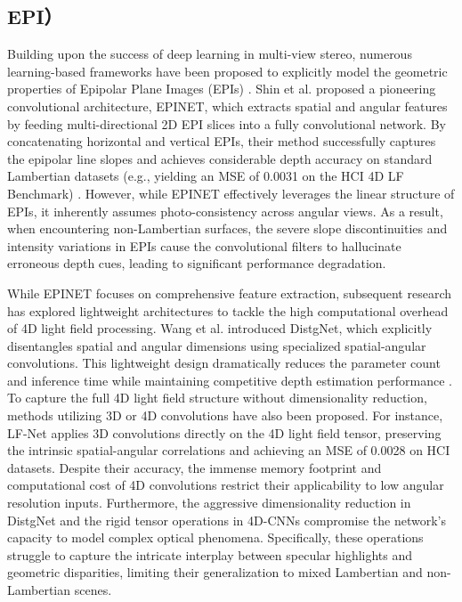 \documentclass[lettersize,journal]{IEEEtran}
\begin{document}
\subsection{EPI）}

Building upon the success of deep learning in multi-view stereo, numerous learning-based frameworks have been proposed to explicitly model the geometric properties of Epipolar Plane Images (EPIs) \cite{learninglearn}. Shin et al. \cite{shinshin} proposed a pioneering convolutional architecture, EPINET, which extracts spatial and angular features by feeding multi-directional 2D EPI slices into a fully convolutional network. By concatenating horizontal and vertical EPIs, their method successfully captures the epipolar line slopes and achieves considerable depth accuracy on standard Lambertian datasets (e.g., yielding an MSE of 0.0031 on the HCI 4D LF Benchmark) \cite{lambertian_24}. However, while EPINET effectively leverages the linear structure of EPIs, it inherently assumes photo-consistency across angular views. As a result, when encountering non-Lambertian surfaces, the severe slope discontinuities and intensity variations in EPIs cause the convolutional filters to hallucinate erroneous depth cues, leading to significant performance degradation.

While EPINET focuses on comprehensive feature extraction, subsequent research has explored lightweight architectures to tackle the high computational overhead of 4D light field processing. Wang et al. \cite{wangwang_25} introduced DistgNet, which explicitly disentangles spatial and angular dimensions using specialized spatial-angular convolutions. This lightweight design dramatically reduces the parameter count and inference time while maintaining competitive depth estimation performance \cite{lightweigh}. To capture the full 4D light field structure without dimensionality reduction, methods utilizing 3D or 4D convolutions have also been proposed. For instance, LF-Net \cite{lflf} applies 3D convolutions directly on the 4D light field tensor, preserving the intrinsic spatial-angular correlations and achieving an MSE of 0.0028 on HCI datasets. Despite their accuracy, the immense memory footprint and computational cost of 4D convolutions restrict their applicability to low angular resolution inputs. Furthermore, the aggressive dimensionality reduction in DistgNet and the rigid tensor operations in 4D-CNNs compromise the network's capacity to model complex optical phenomena. Specifically, these operations struggle to capture the intricate interplay between specular highlights and geometric disparities, limiting their generalization to mixed Lambertian and non-Lambertian scenes.
\end{document}
